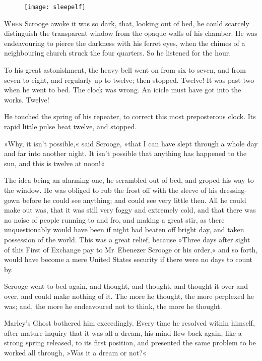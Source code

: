\begin{figure}[h]
\centering
\texttt{[image: sleepelf]}
\caption[Headpiece to Stave II]{}
\end{figure}

\lettrine[lines=4]{W}{hen} Scrooge awoke it was so dark, that, looking out of bed, he could scarcely distinguish the transparent window from the opaque walls of his chamber. He was endeavouring to pierce the darkness with his ferret eyes, when the chimes of a neighbouring church struck the four quarters. So he listened for the hour.

To his great astonishment, the heavy bell went on from six to seven, and from seven to eight, and regularly up to twelve; then stopped. Twelve! It was past two when he went to bed. The clock was wrong. An icicle must have got into the works. Twelve!

He touched the spring of his repeater, to correct this most preposterous clock. Its rapid little pulse beat twelve, and stopped.

»Why, it isn't possible,« said Scrooge, »that I can have slept  through a whole day and far into another night. It isn't possible that anything has happened to the sun, and this is twelve at noon!«

The idea being an alarming one, he scrambled out of bed, and groped his way to the window. He was obliged to rub the frost off with the sleeve of his dressing-gown before he could see anything; and could see very little then. All he could make out was, that it was still very foggy and extremely cold, and that there was no noise of people running to and fro, and making a great stir, as there unquestionably would have been if night had beaten off bright day, and taken possession of the world. This was a great relief, because »Three days after sight of this First of Exchange pay to Mr~Ebenezer Scrooge or his order,« and so forth, would have become a mere United States security if there were no days to count by.

Scrooge went to bed again, and thought, and thought, and  thought it over and over, and could make nothing of it. The more he thought, the more perplexed he was; and, the more he endeavoured not to think, the more he thought.

Marley's Ghost bothered him exceedingly. Every time he resolved within himself, after mature inquiry that it was all a dream, his mind flew back again, like a strong spring released, to its first position, and presented the same problem to be worked all  through, »Was it a dream or not?«

